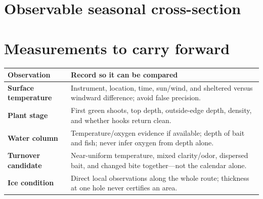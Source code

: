 \newpage
\section{Observable seasonal cross-section}
\begin{center}
\end{center}

\section{Measurements to carry forward}
\begin{tabularx}{\linewidth}{@{}>{\bfseries}p{.24\linewidth}X@{}}
\toprule Observation&Record so it can be compared\\\midrule
Surface temperature&Instrument, location, time, sun/wind, and sheltered versus
windward difference; avoid false precision.\\
Plant stage&First green shoots, top depth, outside-edge depth, density, and
whether hooks return clean.\\
Water column&Temperature/oxygen evidence if available; depth of bait and fish;
never infer oxygen from depth alone.\\
Turnover candidate&Near-uniform temperature, mixed clarity/odor, dispersed
bait, and changed bite together—not the calendar alone.\\
Ice condition&Direct local observations along the whole route; thickness at
one hole never certifies an area.\\
\bottomrule
\end{tabularx}

